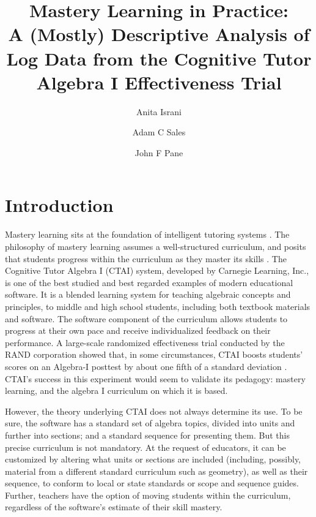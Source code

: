 \documentclass[12pt]{article}\usepackage[]{graphicx}\usepackage[]{color}
\title{Mastery Learning in Practice:\\
A (Mostly) Descriptive Analysis of Log Data from the Cognitive Tutor Algebra I Effectiveness Trial}
\author{Anita Israni \and Adam C Sales \and John F Pane}
\begin{document}
\maketitle

\section{Introduction}
Mastery learning sits at the foundation of intelligent tutoring
systems \citep[e.g.][]{corbett2001cognitive,wenger2014artificial}.
The philosophy of mastery learning assumes a well-structured
curriculum, and posits that students progress within the curriculum as
they master its skills
\citep{bloom1968learning,kulik1990effectiveness}. The Cognitive Tutor
Algebra I (CTAI) system, developed by Carnegie Learning, Inc., is one of the best studied and best regarded examples of modern educational software. It is a blended learning system for teaching algebraic concepts and principles, to middle and high school students, including both textbook materials and software. The software component of the curriculum allows students to progress at their own pace and receive individualized feedback on their performance. A large-scale randomized effectiveness trial conducted by the RAND corporation showed that, in some circumstances, CTAI boosts students' scores on an Algebra-I posttest by about one fifth of a standard deviation \citep{pane2014effectiveness}. CTAI's success in this experiment would seem to validate its pedagogy: mastery learning, and the algebra I curriculum on which it is based.

However, the theory underlying CTAI does not always determine its
use. To be sure, the software has a standard set of algebra topics,
divided into units and further into sections; and a standard sequence
for presenting them. But this precise curriculum is not mandatory. At
the request of educators, it can be customized by altering what units
or sections are included (including, possibly, material from a
different standard curriculum such as geometry), as well as their
sequence, to conform to local or state standards or scope and sequence
guides. Further, teachers have the option of moving students within
the curriculum, regardless of the software's estimate of their skill
mastery.
\end{document}
